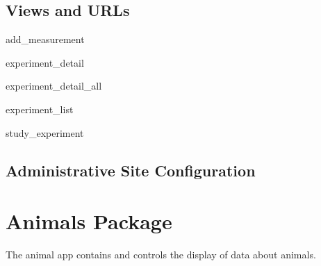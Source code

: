 \documentclass[letterpaper,10pt,english]{sphinxmanual}
\begin{document}
\subsection{Views and URLs}
\hypertarget{module-data.views}{}
\modulesynopsis{}

\hypertarget{data.views.add_measurement}{}\begin{memberdesc}{add\_measurement}\end{memberdesc}

\hypertarget{data.views.experiment_detail}{}\begin{memberdesc}{experiment\_detail}\end{memberdesc}

\hypertarget{data.views.experiment_detail_all}{}\begin{memberdesc}{experiment\_detail\_all}\end{memberdesc}

\hypertarget{data.views.experiment_list}{}\begin{memberdesc}{experiment\_list}\end{memberdesc}

\hypertarget{data.views.study_experiment}{}\begin{memberdesc}{study\_experiment}\end{memberdesc}
\hypertarget{module-data.urls}{}
\modulesynopsis{}

\subsection{Administrative Site Configuration}
\hypertarget{module-data.admin}{}
\modulesynopsis{}

\section{Animals Package}
\hypertarget{module-animal}{}
\modulesynopsis{}
The animal app contains and controls the display of data about animals.
\end{document}
